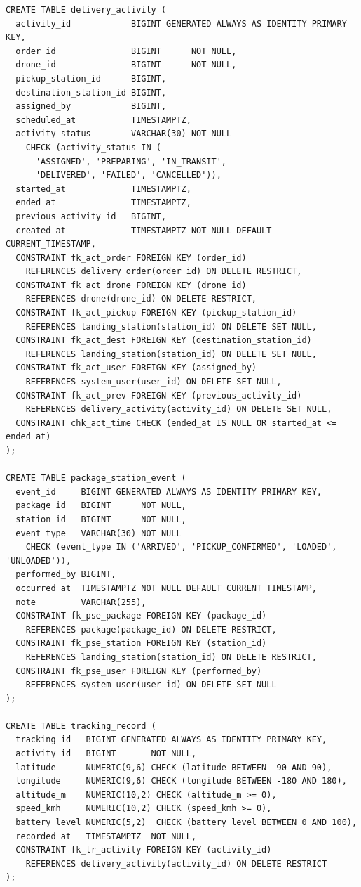 \begin{verbatim}
CREATE TABLE delivery_activity (
  activity_id            BIGINT GENERATED ALWAYS AS IDENTITY PRIMARY KEY,
  order_id               BIGINT      NOT NULL,
  drone_id               BIGINT      NOT NULL,
  pickup_station_id      BIGINT,
  destination_station_id BIGINT,
  assigned_by            BIGINT,
  scheduled_at           TIMESTAMPTZ,
  activity_status        VARCHAR(30) NOT NULL
    CHECK (activity_status IN (
      'ASSIGNED', 'PREPARING', 'IN_TRANSIT',
      'DELIVERED', 'FAILED', 'CANCELLED')),
  started_at             TIMESTAMPTZ,
  ended_at               TIMESTAMPTZ,
  previous_activity_id   BIGINT,
  created_at             TIMESTAMPTZ NOT NULL DEFAULT CURRENT_TIMESTAMP,
  CONSTRAINT fk_act_order FOREIGN KEY (order_id)
    REFERENCES delivery_order(order_id) ON DELETE RESTRICT,
  CONSTRAINT fk_act_drone FOREIGN KEY (drone_id)
    REFERENCES drone(drone_id) ON DELETE RESTRICT,
  CONSTRAINT fk_act_pickup FOREIGN KEY (pickup_station_id)
    REFERENCES landing_station(station_id) ON DELETE SET NULL,
  CONSTRAINT fk_act_dest FOREIGN KEY (destination_station_id)
    REFERENCES landing_station(station_id) ON DELETE SET NULL,
  CONSTRAINT fk_act_user FOREIGN KEY (assigned_by)
    REFERENCES system_user(user_id) ON DELETE SET NULL,
  CONSTRAINT fk_act_prev FOREIGN KEY (previous_activity_id)
    REFERENCES delivery_activity(activity_id) ON DELETE SET NULL,
  CONSTRAINT chk_act_time CHECK (ended_at IS NULL OR started_at <= ended_at)
);

CREATE TABLE package_station_event (
  event_id     BIGINT GENERATED ALWAYS AS IDENTITY PRIMARY KEY,
  package_id   BIGINT      NOT NULL,
  station_id   BIGINT      NOT NULL,
  event_type   VARCHAR(30) NOT NULL
    CHECK (event_type IN ('ARRIVED', 'PICKUP_CONFIRMED', 'LOADED', 'UNLOADED')),
  performed_by BIGINT,
  occurred_at  TIMESTAMPTZ NOT NULL DEFAULT CURRENT_TIMESTAMP,
  note         VARCHAR(255),
  CONSTRAINT fk_pse_package FOREIGN KEY (package_id)
    REFERENCES package(package_id) ON DELETE RESTRICT,
  CONSTRAINT fk_pse_station FOREIGN KEY (station_id)
    REFERENCES landing_station(station_id) ON DELETE RESTRICT,
  CONSTRAINT fk_pse_user FOREIGN KEY (performed_by)
    REFERENCES system_user(user_id) ON DELETE SET NULL
);

CREATE TABLE tracking_record (
  tracking_id   BIGINT GENERATED ALWAYS AS IDENTITY PRIMARY KEY,
  activity_id   BIGINT       NOT NULL,
  latitude      NUMERIC(9,6) CHECK (latitude BETWEEN -90 AND 90),
  longitude     NUMERIC(9,6) CHECK (longitude BETWEEN -180 AND 180),
  altitude_m    NUMERIC(10,2) CHECK (altitude_m >= 0),
  speed_kmh     NUMERIC(10,2) CHECK (speed_kmh >= 0),
  battery_level NUMERIC(5,2)  CHECK (battery_level BETWEEN 0 AND 100),
  recorded_at   TIMESTAMPTZ  NOT NULL,
  CONSTRAINT fk_tr_activity FOREIGN KEY (activity_id)
    REFERENCES delivery_activity(activity_id) ON DELETE RESTRICT
);


\end{verbatim}
